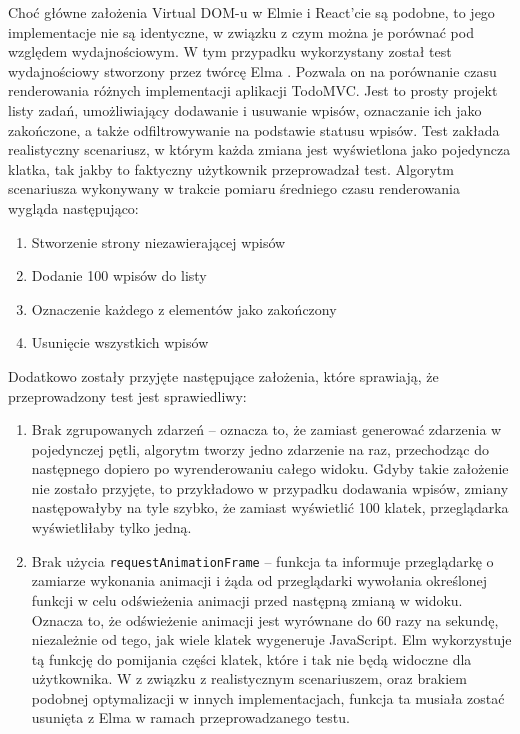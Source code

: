 Choć główne założenia Virtual DOM-u w Elmie i React'cie są podobne, to jego implementacje nie są identyczne, w związku z czym można je porównać pod względem wydajnościowym. W tym przypadku wykorzystany został test wydajnościowy stworzony przez twórcę Elma \cite{perComp}. Pozwala on na porównanie czasu renderowania różnych implementacji aplikacji TodoMVC. Jest to prosty projekt listy zadań, umożliwiający dodawanie i usuwanie wpisów, oznaczanie ich jako zakończone, a także odfiltrowywanie na podstawie statusu wpisów. Test zakłada realistyczny scenariusz, w którym każda zmiana jest wyświetlona jako pojedyncza klatka, tak jakby to faktyczny użytkownik przeprowadzał test. Algorytm scenariusza wykonywany w trakcie pomiaru średniego czasu renderowania wygląda następująco:
\begin{enumerate}
	\item Stworzenie strony niezawierającej wpisów
	\item Dodanie 100 wpisów do listy
	\item Oznaczenie każdego z elementów jako zakończony
	\item Usunięcie wszystkich wpisów
\end{enumerate}
Dodatkowo zostały przyjęte następujące założenia, które sprawiają, że przeprowadzony test jest sprawiedliwy:
\begin{enumerate}
	\item Brak zgrupowanych zdarzeń -- oznacza to, że zamiast generować zdarzenia w pojedynczej pętli, algorytm tworzy jedno zdarzenie na raz, przechodząc do następnego dopiero po wyrenderowaniu całego widoku. Gdyby takie założenie nie zostało przyjęte, to przykładowo w przypadku dodawania wpisów, zmiany następowałyby na tyle szybko, że zamiast wyświetlić 100 klatek, przeglądarka wyświetliłaby tylko jedną.
	\item Brak użycia \lstinline{requestAnimationFrame} -- funkcja ta informuje przeglądarkę o zamiarze wykonania animacji i żąda od przeglądarki wywołania określonej funkcji w celu odświeżenia animacji przed następną zmianą w widoku. Oznacza to, że odświeżenie animacji jest wyrównane do 60 razy na sekundę, niezależnie od tego, jak wiele klatek wygeneruje JavaScript. Elm wykorzystuje tą funkcję do pomijania części klatek, które i tak nie będą widoczne dla użytkownika. W z związku z realistycznym scenariuszem, oraz brakiem podobnej optymalizacji w innych implementacjach, funkcja ta musiała zostać usunięta z Elma w ramach przeprowadzanego testu.
\end{enumerate}

